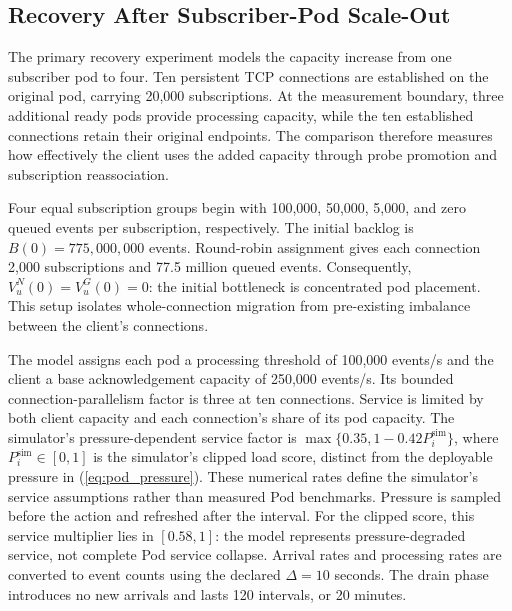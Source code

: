 \subsection{Recovery After Subscriber-Pod Scale-Out}
\label{sec:scaleout-recovery}

The primary recovery experiment models the capacity increase from one
subscriber pod to four. Ten persistent TCP connections are established on the
original pod, carrying 20,000 subscriptions. At the measurement boundary,
three additional ready pods provide processing capacity, while the ten
established connections retain their original endpoints. The comparison
therefore measures how effectively the client uses the added capacity through
probe promotion and subscription reassociation.

Four equal subscription groups begin with 100,000, 50,000, 5,000, and zero
queued events per subscription, respectively. The initial backlog is
$B(0)=775{,}000{,}000$ events. Round-robin assignment gives each connection
2,000 subscriptions and 77.5 million queued events. Consequently,
$V^N_u(0)=V^G_u(0)=0$: the initial bottleneck is concentrated pod placement.
This setup isolates whole-connection migration from pre-existing imbalance
between the client's connections.

The model assigns each pod a processing threshold of 100,000 events/s and
the client a base acknowledgement capacity of 250,000 events/s. Its bounded
connection-parallelism factor is three at ten connections. Service is limited
by both client capacity and each connection's share of its pod capacity.
The simulator's pressure-dependent service factor is
$\max\{0.35,1-0.42P_i^{\mathrm{sim}}\}$, where $P_i^{\mathrm{sim}}\in[0,1]$ is the simulator's
clipped load score, distinct from the deployable pressure in
(\ref{eq:pod_pressure}). These numerical rates define the simulator's service
assumptions rather than measured Pod benchmarks. Pressure is sampled before the action
and refreshed after the interval. For the clipped score, this service
multiplier lies in $[0.58,1]$: the model represents pressure-degraded service,
not complete Pod service collapse. Arrival rates and processing rates are
converted to event counts using the declared $\Delta=10$ seconds. The drain
phase introduces no new arrivals and lasts 120 intervals, or 20 minutes.

